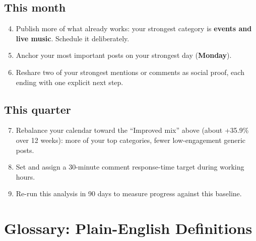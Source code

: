 \documentclass[11pt,a4paper]{article}
\begin{document}
\subsection*{This month}
\begin{enumerate}
  \setcounter{enumi}{3}
  \item Publish more of what already works: your strongest category is \textbf{events and live music}. Schedule it deliberately.
  \item Anchor your most important posts on your strongest day (\textbf{Monday}).
  \item Reshare two of your strongest mentions or comments as social proof, each ending with one explicit next step.
\end{enumerate}

\subsection*{This quarter}
\begin{enumerate}
  \setcounter{enumi}{6}
  \item Rebalance your calendar toward the \textquotedblleft Improved mix\textquotedblright{} above (about +35.9\% over 12 weeks): more of your top categories, fewer low-engagement generic posts.
  \item Set and assign a 30-minute comment response-time target during working hours.
  \item Re-run this analysis in 90 days to measure progress against this baseline.
\end{enumerate}

\section*{\color{tregreen}Glossary: Plain-English Definitions}
\end{document}
